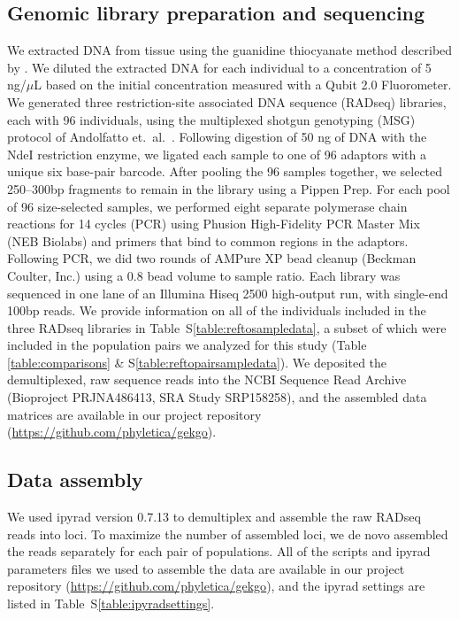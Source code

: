 \ifembed{

}{}

\ifembed{

}{}

\subsection{Genomic library preparation and sequencing}

We extracted DNA from tissue using the guanidine thiocyanate method described
by \citet{Esselstyn2008}.
We diluted the extracted DNA for each individual to a concentration of 5
ng/$\mu$L based on the initial concentration measured with a Qubit 2.0
Fluorometer.
We generated three restriction-site associated DNA sequence (RADseq) libraries,
each with 96 individuals, using the multiplexed shotgun genotyping (MSG)
protocol of Andolfatto et.\ al.\ \citep{Andolfatto2011}.
Following digestion of 50 ng of DNA with the NdeI restriction enzyme, we
ligated each sample to one of 96 adaptors with a unique six base-pair barcode.
After pooling the 96 samples together, we selected 250--300bp fragments to
remain in the library using a Pippen Prep.
For each pool of 96 size-selected samples, we performed eight separate
polymerase chain reactions for 14 cycles (PCR) using Phusion High-Fidelity PCR
Master Mix (NEB Biolabs) and primers that bind to common regions in the
adaptors.
Following PCR, we did two rounds of AMPure XP bead cleanup (Beckman Coulter,
Inc.) using a 0.8 bead volume to sample ratio.
Each library was sequenced in one lane of an Illumina Hiseq 2500 high-output
run, with single-end 100bp reads.
We provide information on all of the individuals included in the three RADseq
libraries in Table~S\ref{table:reftosampledata}, a subset of which were
included in the population pairs we analyzed for this study (Table
\ref{table:comparisons} \& S\ref{table:reftopairsampledata}).
We deposited the demultiplexed, raw sequence reads into the NCBI Sequence Read
Archive
(Bioproject PRJNA486413, SRA Study SRP158258),
and the assembled data matrices are available in our project repository
(\url{https://github.com/phyletica/gekgo}).


\subsection{Data assembly}
We used ipyrad version 0.7.13 \citep{ipyrad0713} to demultiplex and assemble
the raw RADseq reads into loci.
To maximize the number of assembled loci, we de novo assembled the reads
separately for each pair of populations.
All of the scripts and ipyrad parameters files we used to assemble the data are
available in our project repository (\url{https://github.com/phyletica/gekgo}),
and the ipyrad settings are listed in
Table~S\ref{table:ipyradsettings}.

